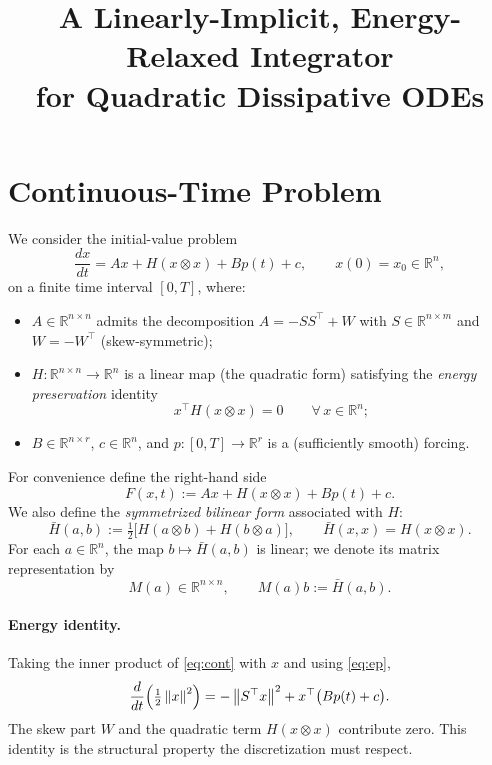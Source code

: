 \documentclass[11pt]{article}
\title{A Linearly-Implicit, Energy-Relaxed Integrator \\
for Quadratic Dissipative ODEs}
\author{}
\date{}
\theoremstyle{definition}
\newcommand{\R}{\mathbb{R}}
\newcommand{\norm}[1]{\left\|#1\right\|}
\begin{document}
\maketitle

\section{Continuous-Time Problem}

We consider the initial-value problem
\begin{equation}
\label{eq:cont}
\frac{dx}{dt} = A x + H(x \otimes x) + B p(t) + c, \qquad x(0) = x_0 \in \R^n,
\end{equation}
on a finite time interval $[0, T]$, where:
\begin{itemize}[leftmargin=*]
    \item $A \in \R^{n \times n}$ admits the decomposition $A = -SS^\top + W$ with $S \in \R^{n \times m}$ and $W = -W^\top$ (skew-symmetric);
    \item $H : \R^{n \times n} \to \R^n$ is a linear map (the quadratic form) satisfying the \emph{energy preservation} identity
    \begin{equation}
    \label{eq:ep}
    x^\top H(x \otimes x) = 0 \qquad \forall\, x \in \R^n;
    \end{equation}
    \item $B \in \R^{n \times r}$, $c \in \R^n$, and $p : [0, T] \to \R^r$ is a (sufficiently smooth) forcing.
\end{itemize}

For convenience define the right-hand side
\[
F(x, t) := A x + H(x \otimes x) + B p(t) + c.
\]
We also define the \emph{symmetrized bilinear form} associated with $H$:
\[
\bar H(a, b) := \tfrac{1}{2}\bigl[H(a \otimes b) + H(b \otimes a)\bigr], \qquad \bar H(x, x) = H(x \otimes x).
\]
For each $a \in \R^n$, the map $b \mapsto \bar H(a, b)$ is linear; we denote its matrix representation by
\[
M(a) \in \R^{n \times n}, \qquad M(a) b := \bar H(a, b).
\]

\paragraph{Energy identity.} Taking the inner product of \eqref{eq:cont} with $x$ and using \eqref{eq:ep},
\begin{equation}
\label{eq:cont-energy}
\frac{d}{dt}\Bigl(\tfrac{1}{2}\norm{x}^2\Bigr)
= -\norm{S^\top x}^2 + x^\top \bigl(B p(t) + c\bigr).
\end{equation}
The skew part $W$ and the quadratic term $H(x \otimes x)$ contribute zero. This identity is the structural property the discretization must respect.
\end{document}
